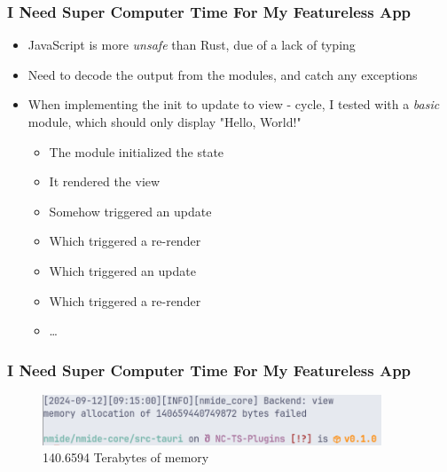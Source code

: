 \begin{frame}
  \frametitle{I Need Super Computer Time For My Featureless App}
  \begin{itemize}
      \pause
    \item JavaScript is more \textit{unsafe} than Rust, due of a lack of typing
      \pause
    \item Need to decode the output from the modules, and catch any exceptions
      \pause
    \item When implementing the init to update to view - cycle, I tested with
      a \textit{basic} module, which should only display "Hello, World!"
      \begin{itemize}
          \pause
        \item The module initialized the state
          \pause
        \item It rendered the view
          \pause
        \item Somehow triggered an update
          \pause
        \item Which triggered a re-render
          \pause
        \item Which triggered an update
          \pause
        \item Which triggered a re-render
          \pause
        \item \dots
      \end{itemize}
  \end{itemize}
\end{frame}

\hidelogo

\begin{frame}
  \frametitle{I Need Super Computer Time For My Featureless App}
  \begin{figure}
    \centering
    \includegraphics[width=0.9\textwidth]{./pics/memory-allocation-zoomed.png}
    \caption{140.6594 Terabytes of memory}
  \end{figure}
\end{frame}

